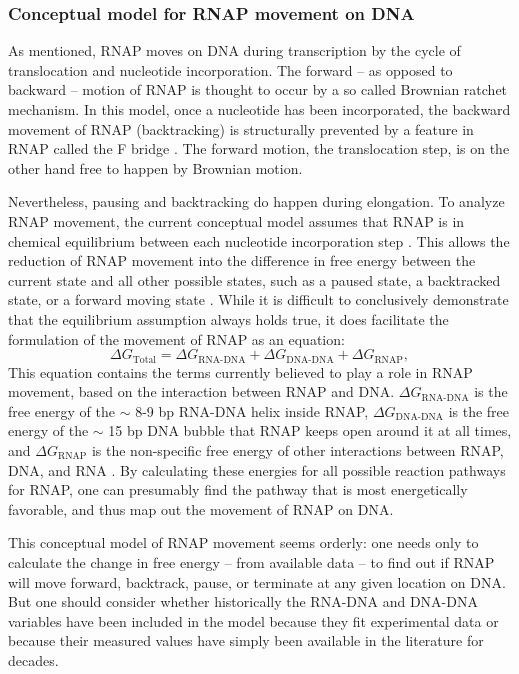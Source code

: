 %

\subsubsection{Conceptual model for RNAP movement on DNA}
As mentioned, RNAP moves on DNA during transcription by the cycle of
translocation and nucleotide incorporation. The forward -- as opposed to
backward -- motion of RNAP is thought to occur by a so called Brownian ratchet
mechanism. In this model, once a nucleotide has been incorporated, the backward
movement of RNAP (backtracking) is structurally prevented by a feature in RNAP
called the F bridge \cite{bar-nahum_ratchet_2005}. The forward motion, the
translocation step, is on the other hand free to happen by Brownian motion.

Nevertheless, pausing and backtracking do happen during elongation. To analyze
RNAP movement, the current conceptual model assumes that RNAP is in chemical
equilibrium between each nucleotide incorporation step
\cite{greive_thinking_2005}. This allows the reduction of RNAP movement into
the difference in free energy between the current state and all other
possible states, such as a paused state, a backtracked state, or a forward
moving state \cite{greive_thinking_2005}. While it is difficult to conclusively
demonstrate that the equilibrium assumption always holds true, it does
facilitate the formulation of the movement of RNAP as an equation:
\begin{equation}
	\Delta G_{\text{Total}} = \Delta G_{\text{RNA-DNA}} + \Delta
	G_{\text{DNA-DNA}} + \Delta G_{\text{RNAP}},
	\label{eq:rnap_energy_balance}
\end{equation}
This equation contains the terms currently believed to play a role in RNAP
movement, based on the interaction between RNAP and DNA. $\Delta
G_{\text{RNA-DNA}}$ is the free energy of the $\sim$ 8-9 bp RNA-DNA helix
inside RNAP, $\Delta G_{\text{DNA-DNA}}$ is the free energy of the $\sim$ 15 bp
DNA bubble that RNAP keeps open around it at all times, and $\Delta
G_{\text{RNAP}}$ is the non-specific free energy of other interactions between
RNAP, DNA, and RNA \cite{greive_thinking_2005}. By calculating these energies
for all possible reaction pathways for RNAP, one can presumably find the
pathway that is most energetically favorable, and thus map out the movement of
RNAP on DNA.

This conceptual model of RNAP movement seems orderly: one needs only to
calculate the change in free energy -- from available data -- to find out if
RNAP will move forward, backtrack, pause, or terminate at any given location on
DNA. But one should consider whether historically the RNA-DNA and DNA-DNA
variables have been included in the model because they fit experimental data or
because their measured values have simply been available in the literature for
decades.

